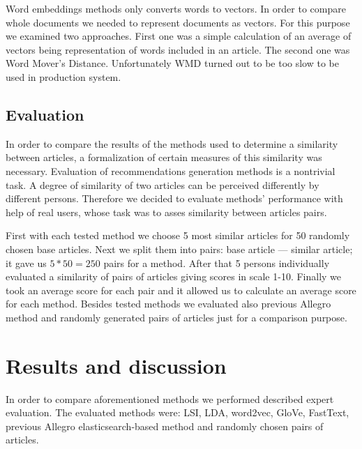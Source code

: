 \documentclass[twoside,twocolumn]{article}
\begin{document}
	Word embeddings methods only converts words to vectors. In order to compare whole documents we needed to represent documents as vectors. For this purpose we examined two approaches. First one was a simple calculation of an average of vectors being representation of words included in an article. The second one was Word Mover's Distance\cite{wmd}. Unfortunately WMD turned out to be too slow to be used in production system.
	
	
	\subsection{Evaluation}
	
	In order to compare the results of the methods used to determine a similarity between articles, a formalization of certain measures of this similarity was necessary. Evaluation of recommendations generation methods is a nontrivial task. A degree of similarity of two articles can be perceived differently by different persons. Therefore we decided to evaluate methods' performance with help of real users, whose task was to asses similarity between articles pairs.
	
	First with each tested method we choose 5 most similar articles for 50 randomly chosen base articles. Next we split them into pairs: base article --- similar article; it gave us $5*50=250$ pairs for a method. After that 5 persons individually evaluated a similarity of pairs of articles giving scores in scale 1-10. Finally we took an average score for each pair and it allowed us to calculate an average score for each method. Besides tested methods we evaluated also previous Allegro method and randomly generated pairs of articles just for a comparison purpose.
	
	
	
	\section{Results and discussion}
	In order to compare aforementioned methods we performed described expert evaluation. The evaluated methods were: LSI, LDA, word2vec, GloVe, FastText, previous Allegro elasticsearch-based method and randomly chosen pairs of articles.
\end{document}
